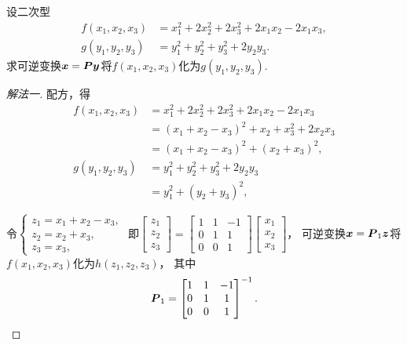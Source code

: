 \begin{example}
设二次型\begin{align*}
	f(x_1,x_2,x_3) &= x_1^2 + 2 x_2^2 + 2 x_3^2 + 2 x_1 x_2 - 2 x_1 x_3, \\
	g(y_1,y_2,y_3) &= y_1^2 + y_2^2 + y_3^2 + 2 y_2 y_3.
\end{align*}
求可逆变换\(\boldsymbol{x} = \boldsymbol{P} \boldsymbol{y}\)将\(f(x_1,x_2,x_3)\)化为\(g(y_1,y_2,y_3)\).
\begin{solution}\let\qed\relax
\begin{proof}[解法一]
配方，得\begin{align*}
	f(x_1,x_2,x_3) &= x_1^2 + 2 x_2^2 + 2 x_3^2 + 2 x_1 x_2 - 2 x_1 x_3 \\
	&= (x_1 + x_2 - x_3)^2 + x_2 + x_3^2 + 2 x_2 x_3 \\
	&= (x_1 + x_2 - x_3)^2 + (x_2 + x_3)^2, \\
	g(y_1,y_2,y_3) &= y_1^2 + y_2^2 + y_3^2 + 2 y_2 y_3 \\
	&= y_1^2 + (y_2 + y_3)^2,
\end{align*}

令\(\left\{ \begin{array}{l}
	z_1 = x_1 + x_2 - x_3, \\
	z_2 = x_2 + x_3, \\
	z_3 = x_3,
\end{array} \right.\)
即\(\begin{bmatrix}
	z_1 \\ z_2 \\ z_3
\end{bmatrix}
= \begin{bmatrix}
	1 & 1 & -1 \\
	0 & 1 & 1 \\
	0 & 0 & 1
\end{bmatrix}
\begin{bmatrix}
	x_1 \\ x_2 \\ x_3
\end{bmatrix}\)，
可逆变换\(\boldsymbol{x} = \boldsymbol{P}_1 \boldsymbol{z}\)将\(f(x_1,x_2,x_3)\)化为\(h(z_1,z_2,z_3)\)，
其中\begin{equation*}
	\boldsymbol{P}_1 = \begin{bmatrix}
		1 & 1 & -1 \\
		0 & 1 & 1 \\
		0 & 0 & 1
	\end{bmatrix}^{-1}.
\end{equation*}


\end{proof}
\end{solution}
\end{example}
